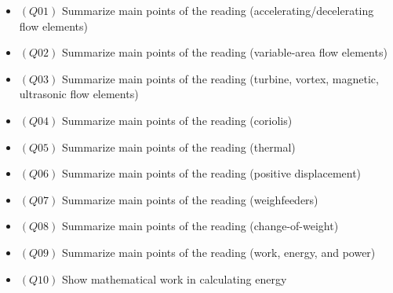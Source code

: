 \begin{itemize}
\begin{itemize}
\begin{itemize}
\item{$(Q01)$} Summarize main points of the reading (accelerating/decelerating flow elements)
\item{$(Q02)$} Summarize main points of the reading (variable-area flow elements)
\item{$(Q03)$} Summarize main points of the reading (turbine, vortex, magnetic, ultrasonic flow elements)
\item{$(Q04)$} Summarize main points of the reading (coriolis)
\item{$(Q05)$} Summarize main points of the reading (thermal)
\item{$(Q06)$} Summarize main points of the reading (positive displacement)
\item{$(Q07)$} Summarize main points of the reading (weighfeeders)
\item{$(Q08)$} Summarize main points of the reading (change-of-weight)
\item{$(Q09)$} Summarize main points of the reading (work, energy, and power)
\item{$(Q10)$} Show mathematical work in calculating energy
\medskip


\end{itemize}
\end{itemize}
\end{itemize}
